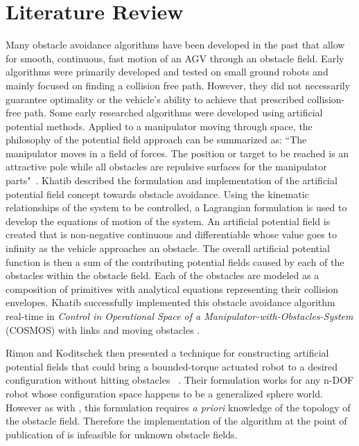 \documentclass[12pt,onecolumn]{report}
\begin{document}

\section{Literature Review}\label{s:LiteratureReview}

Many obstacle avoidance algorithms have been developed in the past that allow for smooth, continuous, fast motion of an AGV through an obstacle field. Early algorithms were primarily developed and tested on small ground robots and mainly focused on finding a collision free path. However, they did not necessarily guarantee optimality or the vehicle's ability to achieve that prescribed collision-free path. Some early researched algorithms were developed using artificial potential methods. Applied to a manipulator moving through space, the philosophy of the potential field approach can be summarized as: ``The manipulator moves in a field of forces. The position or target to be reached is an attractive pole while all obstacles are repulsive surfaces for the manipulator parts"~\cite{Khatib1986}. Khatib described the formulation and implementation of the artificial potential field concept towards obstacle avoidance. Using the kinematic relationships of the system to be controlled, a Lagrangian formulation is used to develop the equations of motion of the system. An artificial potential field is created that is non-negative continuous and differentiable whose value goes to infinity as the vehicle approaches an obstacle. The overall artificial potential function is then a sum of the contributing potential fields caused by each of the obstacles within the obstacle field. Each of the obstacles are modeled as a composition of primitives with analytical equations representing their collision envelopes. Khatib successfully implemented this obstacle avoidance algorithm real-time in \textit{Control in Operational Space of a Manipulator-with-Obstacles-System} (COSMOS) with links and moving obstacles \cite{Khatib1986}. 

Rimon and Koditschek then presented a technique for constructing artificial potential fields that could bring a bounded-torque actuated robot to a desired configuration without hitting obstacles ~\cite{Rimon&Koditschek1992}. Their formulation works for any n-DOF robot whose configuration space happens to be a generalized sphere world. However as with \cite{Khatib1986}, this formulation requires \textit{a priori} knowledge of the topology of the obstacle field. Therefore the implementation of the algorithm at the point of publication of \cite{Rimon&Koditschek1992} is infeasible for unknown obstacle fields. 
\end{document}
